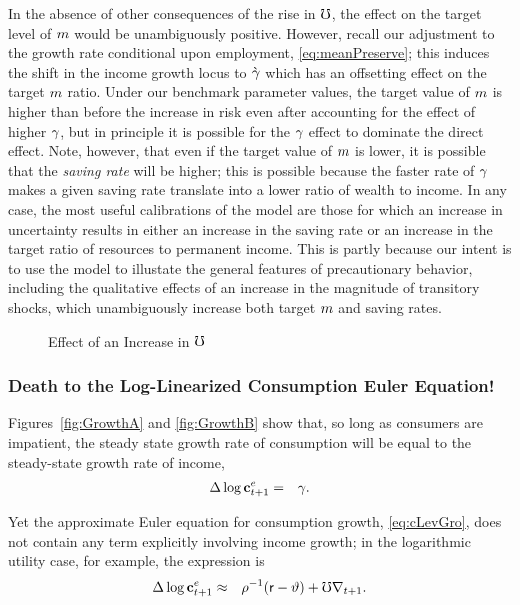 \documentclass{handout}
\begin{document}
In the absence of other consequences of the rise in $\mho$, the
effect on the target level of $m$ would be unambiguously positive.
However, recall our adjustment to the growth rate conditional upon
employment, \eqref{eq:meanPreserve}; this induces the shift in the
income growth locus to $\grave{\gamma}$ which has an offsetting effect
on the target $m$ ratio.  Under our benchmark parameter values,
the target value of $m$ is higher than before the increase in risk
even after accounting for the effect of higher $\gamma$, but in
principle it is possible for the $\gamma$ effect to dominate the direct
effect.  Note, however, that even if the target value of $m$ is
lower, it is possible that the {\it saving rate} will be higher; this
is possible because the faster rate of $\gamma$ makes a given saving
rate translate into a lower ratio of wealth to income.  In any case,
the most useful calibrations of the model are those for
which an increase in uncertainty results in either an increase in the
saving rate or an increase in the target ratio of resources to
permanent income.  This is partly because our intent is to use the
model to illustate the general features of precautionary behavior,
including the qualitative effects of an increase in the magnitude of
transitory shocks, which unambiguously increase both target $m$
and saving rates.

\begin{figure}
\caption{Effect of an Increase in $\mho$}
\label{fig:cGroIncreaseMhoPlot}
\end{figure}

\subsubsection{Death to the Log-Linearized Consumption Euler Equation!}

Figures~\ref{fig:GrowthA} and \ref{fig:GrowthB} show that, so long as
consumers are impatient, the steady state growth rate of consumption
will be equal to the steady-state growth rate of income,
\begin{eqnarray}
        \Delta \log \mathbf{c}^{e}_{t+1} & = & \gamma. \label{eq:ceqg}
\end{eqnarray}

Yet the approximate Euler equation for consumption growth, \eqref{eq:cLevGro}, does 
not contain any term explicitly involving income growth; in the logarithmic utility
case, for example, the expression is
\begin{eqnarray}
         \Delta \log \mathbf{c}^{e}_{t+1} & \approx & \rho^{-1}(\mathsf{r}-\vartheta) +  \mho \nabla _{t+1}. \label{eq:cdelapprox2}
\end{eqnarray}
\end{document}
